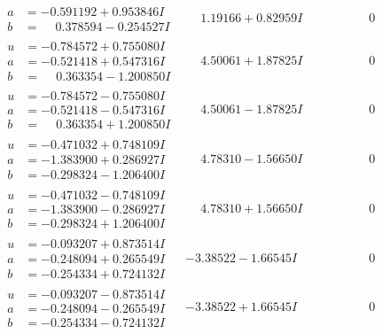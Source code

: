 \documentclass[1p]{elsarticle_modified}
\theoremstyle{definition}
\begin{document}
$$\begin{array}{c|c|c}
\begin{aligned}
a &= -0.591192 + 0.953846 I \\
b &= \phantom{-}0.378594 - 0.254527 I\end{aligned}
 & \phantom{-}1.19166 + 0.82959 I & \phantom{-0.000000 } 0 \\ \hline\begin{aligned}
u &= -0.784572 + 0.755080 I \\
a &= -0.521418 + 0.547316 I \\
b &= \phantom{-}0.363354 - 1.200850 I\end{aligned}
 & \phantom{-}4.50061 + 1.87825 I & \phantom{-0.000000 } 0 \\ \hline\begin{aligned}
u &= -0.784572 - 0.755080 I \\
a &= -0.521418 - 0.547316 I \\
b &= \phantom{-}0.363354 + 1.200850 I\end{aligned}
 & \phantom{-}4.50061 - 1.87825 I & \phantom{-0.000000 } 0 \\ \hline\begin{aligned}
u &= -0.471032 + 0.748109 I \\
a &= -1.383900 + 0.286927 I \\
b &= -0.298324 - 1.206400 I\end{aligned}
 & \phantom{-}4.78310 - 1.56650 I & \phantom{-0.000000 } 0 \\ \hline\begin{aligned}
u &= -0.471032 - 0.748109 I \\
a &= -1.383900 - 0.286927 I \\
b &= -0.298324 + 1.206400 I\end{aligned}
 & \phantom{-}4.78310 + 1.56650 I & \phantom{-0.000000 } 0 \\ \hline\begin{aligned}
u &= -0.093207 + 0.873514 I \\
a &= -0.248094 + 0.265549 I \\
b &= -0.254334 + 0.724132 I\end{aligned}
 & -3.38522 - 1.66545 I & \phantom{-0.000000 } 0 \\ \hline\begin{aligned}
u &= -0.093207 - 0.873514 I \\
a &= -0.248094 - 0.265549 I \\
b &= -0.254334 - 0.724132 I\end{aligned}
 & -3.38522 + 1.66545 I & \phantom{-0.000000 } 0 \\ \hline\begin{aligned}

\end{aligned}
\end{array}$$
\end{document}
